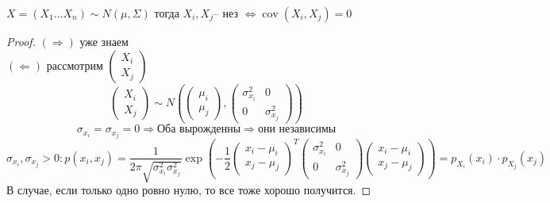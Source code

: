 \documentclass{article}
\DeclareMathOperator{\cov}{cov}
\begin{document}
    \begin{claim}
        $X = (X_1 \dots X_n) \sim N(\mu, \Sigma)$ тогда $X_i, X_j \text{-- нез } \Leftrightarrow \cov(X_i, X_j) =0 $
        \begin{proof}
            $(\Rightarrow)$ уже знаем \\
            $(\Leftarrow)$ рассмотрим $\begin{pmatrix}
                 X_i \\ X_j
            \end{pmatrix}$
            $$ \begin{pmatrix}
                X_i \\ X_j
            \end{pmatrix}
            \sim
            N(
            \begin{pmatrix}
                \mu_i \\ \mu_j
            \end{pmatrix}
            ,
            \begin{pmatrix}
                \sigma_{x_i}^2 & 0 \\
                0 & \sigma_{x_j}^2
            \end{pmatrix}
            )
            $$
            $$\sigma_{x_i} = \sigma_{x_j} = 0 \Rightarrow \text{Оба вырожденны} \Rightarrow\text{они независимы}$$
            $$ \sigma_{x_i}, \sigma_{x_j} > 0: p(x_i, x_j) = \frac{1}{2\pi \sqrt{\sigma_{x_i}^2\sigma_{x_j}^2}} \exp (-\frac{1}{2}
            \begin{pmatrix}
                x_i - \mu_i \\ x_j - \mu_j
            \end{pmatrix}^T
            \begin{pmatrix}
                \sigma_{x_i}^2 & 0 \\
                0 & \sigma_{x_j}^2
            \end{pmatrix}
            \begin{pmatrix}
                x_i - \mu_i \\ x_j - \mu_j
            \end{pmatrix}
            ) = p_{X_i}(x_i) \cdot p_{X_j}(x_j)
            $$
            В случае, если только одно ровно нулю, то все тоже хорошо получится.
        \end{proof}
    \end{claim}
\end{document}
